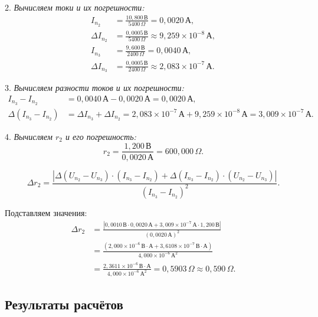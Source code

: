 2. \textit{Вычисляем токи и их погрешности:}
\begin{align*}
	I_{n_2}        & = \frac{10{,}800\,\text{В}}{5400\,\Omega} = 0{,}0020\,\text{А},                     \\
	\Delta I_{n_2} & = \frac{0{,}0005\,\text{В}}{5400\,\Omega} \approx 9{,}259 \times 10^{-8}\,\text{А}, \\
	I_{n_3}        & = \frac{9{,}600\,\text{В}}{2400\,\Omega} = 0{,}0040\,\text{А},                      \\
	\Delta I_{n_3} & = \frac{0{,}0005\,\text{В}}{2400\,\Omega} \approx 2{,}083 \times 10^{-7}\,\text{А}.
\end{align*}

3. \textit{Вычисляем разности токов и их погрешности:}
\begin{align*}
	I_{n_3} - I_{n_2}         & = 0{,}0040\,\text{А} - 0{,}0020\,\text{А} = 0{,}0020\,\text{А},                                                                             \\
	\Delta(I_{n_3} - I_{n_2}) & = \Delta I_{n_3} + \Delta I_{n_2} = 2{,}083 \times 10^{-7}\,\text{А} + 9{,}259 \times 10^{-8}\,\text{А} = 3{,}009 \times 10^{-7}\,\text{А}.
\end{align*}

4. \textit{Вычисляем \( r_2 \) и его погрешность:}
\[
	r_2 = \frac{1{,}200\,\text{В}}{0{,}0020\,\text{А}} = 600{,}000\,\Omega.
\]

\[
	\Delta r_2 = \frac{|\Delta(U_{n_2} - U_{n_3}) \cdot (I_{n_3} - I_{n_2}) + \Delta(I_{n_3} - I_{n_2}) \cdot (U_{n_2} - U_{n_3})|}{(I_{n_3} - I_{n_2})^2}.
\]

Подставляем значения:
\begin{align*}
	\Delta r_2 & = \frac{|0{,}0010\,\text{В} \cdot 0{,}0020\,\text{А} + 3{,}009 \times 10^{-7}\,\text{А} \cdot 1{,}200\,\text{В}|}{(0{,}0020\,\text{А})^2}     \\
	           & = \frac{(2{,}000 \times 10^{-6}\,\text{В}\cdot\text{А} + 3{,}6108 \times 10^{-7}\,\text{В}\cdot\text{А})}{4{,}000 \times 10^{-6}\,\text{А}^2} \\
	           & = \frac{2{,}3611 \times 10^{-6}\,\text{В}\cdot\text{А}}{4{,}000 \times 10^{-6}\,\text{А}^2} = 0{,}5903\,\Omega \approx 0{,}590\,\Omega.
\end{align*}

\subsection{Результаты расчётов}

